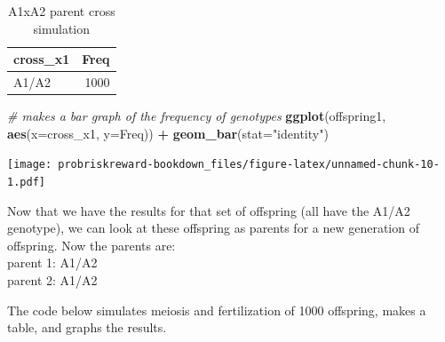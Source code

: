 \documentclass[]{book}
\newenvironment{Shaded}{\begin{snugshade}}{\end{snugshade}}
\newcommand{\KeywordTok}[1]{\textcolor[rgb]{0.13,0.29,0.53}{\textbf{#1}}}
\newcommand{\DataTypeTok}[1]{\textcolor[rgb]{0.13,0.29,0.53}{#1}}
\newcommand{\StringTok}[1]{\textcolor[rgb]{0.31,0.60,0.02}{#1}}
\newcommand{\CommentTok}[1]{\textcolor[rgb]{0.56,0.35,0.01}{\textit{#1}}}
\newcommand{\OperatorTok}[1]{\textcolor[rgb]{0.81,0.36,0.00}{\textbf{#1}}}
\newcommand{\NormalTok}[1]{#1}
\theoremstyle{definition}
\theoremstyle{definition}
\theoremstyle{definition}
\theoremstyle{remark}
\begin{document}
\begin{table}

\caption{\label{tab:unnamed-chunk-10}A1xA2 parent cross simulation}
\centering
\begin{tabular}[t]{lr}
\toprule
cross\_x1 & Freq\\
\midrule
A1/A2 & 1000\\
\bottomrule
\end{tabular}
\end{table}

\begin{Shaded}
\begin{Highlighting}[]
\CommentTok{# makes a bar graph of the frequency of genotypes}
\KeywordTok{ggplot}\NormalTok{(offspring1, }\KeywordTok{aes}\NormalTok{(}\DataTypeTok{x=}\NormalTok{cross_x1, }\DataTypeTok{y=}\NormalTok{Freq)) }\OperatorTok{+}\StringTok{ }\KeywordTok{geom_bar}\NormalTok{(}\DataTypeTok{stat=}\StringTok{"identity"}\NormalTok{)}
\end{Highlighting}
\end{Shaded}

\texttt{[image: probriskreward-bookdown\_files/figure-latex/unnamed-chunk-10-1.pdf]}

Now that we have the results for that set of offspring (all have the
A1/A2 genotype), we can look at these offspring as parents for a new
generation of offspring. Now the parents are:\\
parent 1: A1/A2\\
parent 2: A1/A2

The code below simulates meiosis and fertilization of 1000 offspring,
makes a table, and graphs the results.
\end{document}
